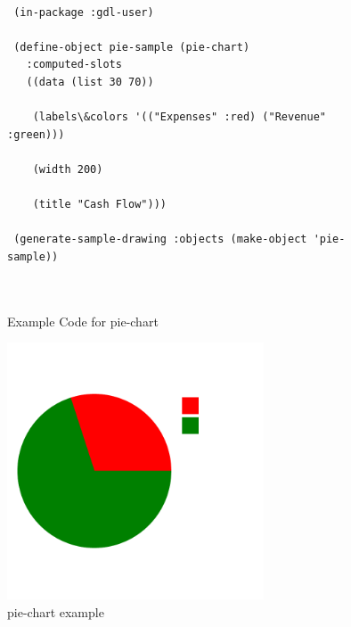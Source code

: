 \documentclass [11pt]{book}
\begin{document}
\begin{itemize}
\begin{figure}
\begin{lrbox}{\boxedverb}
\begin{minipage}{\linewidth}
{\small

\begin{verbatim}

 (in-package :gdl-user)
 
 (define-object pie-sample (pie-chart)
   :computed-slots
   ((data (list 30 70))
   
    (labels\&colors '(("Expenses" :red) ("Revenue" :green)))
   
    (width 200) 
   
    (title "Cash Flow")))

 (generate-sample-drawing :objects (make-object 'pie-sample))

 
\end{verbatim}}
\end{minipage}
\end{lrbox}
\fbox{\usebox{\boxedverb}}

\caption{Example Code for pie-chart}

\label{fig:example-code-pie-chart}

\end{figure}

\begin{figure}
\begin{center}
\includegraphics[width=3in,height=3in]{../images/example-pie-chart.pdf}
\end{center}

\caption{pie-chart example}

\label{fig:pie-chart}

\end{figure}






\end{itemize}
\end{document}
